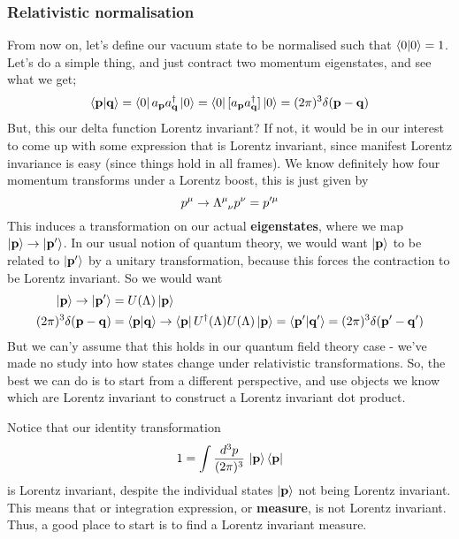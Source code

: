 \subsubsection{Relativistic normalisation} 
From now on, let's define our vacuum state to be normalised such that $ \bra{0}\ket{0}  = 1$. Let's do a simple thing, and just contract two momentum eigenstates, and see what we get; 
\[
\bra{\mathbf{  p  } }\ket{ \mathbf{  q }} = \bra{ 0 }a_{ \mathbf{  p }} a^\dagger_{ \mathbf{  q  }} \ket{ 0 }  = \bra{ 0 }[ a_{ \mathbf{ p  }} a^\dagger_{ \mathbf{  q }} ] \ket{0 }  = ( 2\pi )^3 \delta( \mathbf{  p - q } ) 
\]  But, this our delta function Lorentz invariant? If not, it would be in our interest to come up with some expression that is Lorentz invariant, since manifest Lorentz invariance is easy (since things hold in all frames). We know definitely how four momentum transforms under a Lorentz boost, this is just given by
\[ 
p^\mu \rightarrow \Lambda\indices{^\mu_\nu} p^\nu  = p'^\mu 
\] This induces a transformation on our actual \textbf{eigenstates}, where we map $ \ket{ \mathbf{  p  } } \rightarrow \ket{ \mathbf{  p ' } }$.  
In our usual notion of quantum theory, we would want $ \ket{ \mathbf{  p  } } $ to be related to $ \ket{ \mathbf{  p'  } } $ by a unitary transformation, because this forces the contraction to be Lorentz invariant. So we would want 
\begin{align*} 
\ket{ \mathbf{  p  } } \rightarrow \ket{ \mathbf{  p '  }}  & = U ( \Lambda) \ket { \mathbf{  p  }} \\
( 2\pi )^3 \delta( \mathbf{  p - q } ) &=  \bra{ \mathbf{  p  } }\ket{ \mathbf{  q  } }  \rightarrow \bra{ \mathbf{  p  } }U^\dagger( \Lambda ) U ( \Lambda ) \ket{\mathbf{  p  } }  = \bra{ \mathbf{  p '  }}\ket{ \mathbf{  q'  } }  = (2 \pi )^3 \delta ( \mathbf{  p' - q'  } ) 
\end{align*} 
But we can'y assume that this holds in our quantum field theory case - we've made no study into how states change under relativistic transformations. So, the best we can do is to start from a different perspective, and use objects we know which are Lorentz invariant to construct a Lorentz invariant dot product. 

Notice that our identity transformation
\[ 
1 = \int \frac{ d^3 p }{ (2 \pi)^3 } \, \ket{\mathbf{  p  } }\bra{ \mathbf{  p  } } 
\] is Lorentz invariant, despite the individual states $\ket { \mathbf{  p  } } $ not being Lorentz invariant. This means that or integration expression, or \textbf{measure}, is not Lorentz invariant. Thus, a good place to start is to find a Lorentz invariant measure.

